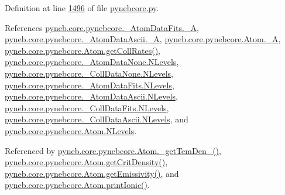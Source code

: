 Definition at line \hyperlink{pynebcore_8py_source_l01496}{1496} of file \hyperlink{pynebcore_8py_source}{pynebcore.\+py}.



References \hyperlink{pynebcore_8py_source_l00093}{pyneb.\+core.\+pynebcore.\+\_\+\+Atom\+Data\+Fits.\+\_\+\+A}, \hyperlink{pynebcore_8py_source_l00402}{pyneb.\+core.\+pynebcore.\+\_\+\+Atom\+Data\+Ascii.\+\_\+\+A}, \hyperlink{pynebcore_8py_source_l01256}{pyneb.\+core.\+pynebcore.\+Atom.\+\_\+\+A}, \hyperlink{pynebcore_8py_source_l01329}{pyneb.\+core.\+pynebcore.\+Atom.\+get\+Coll\+Rates()}, \hyperlink{pynebcore_8py_source_l00062}{pyneb.\+core.\+pynebcore.\+\_\+\+Atom\+Data\+None.\+N\+Levels}, \hyperlink{pynebcore_8py_source_l00075}{pyneb.\+core.\+pynebcore.\+\_\+\+Coll\+Data\+None.\+N\+Levels}, \hyperlink{pynebcore_8py_source_l00155}{pyneb.\+core.\+pynebcore.\+\_\+\+Atom\+Data\+Fits.\+N\+Levels}, \hyperlink{pynebcore_8py_source_l00404}{pyneb.\+core.\+pynebcore.\+\_\+\+Atom\+Data\+Ascii.\+N\+Levels}, \hyperlink{pynebcore_8py_source_l00637}{pyneb.\+core.\+pynebcore.\+\_\+\+Coll\+Data\+Fits.\+N\+Levels}, \hyperlink{pynebcore_8py_source_l00984}{pyneb.\+core.\+pynebcore.\+\_\+\+Coll\+Data\+Ascii.\+N\+Levels}, and \hyperlink{pynebcore_8py_source_l01260}{pyneb.\+core.\+pynebcore.\+Atom.\+N\+Levels}.



Referenced by \hyperlink{pynebcore_8py_source_l01803}{pyneb.\+core.\+pynebcore.\+Atom.\+\_\+get\+Tem\+Den\+\_()}, \hyperlink{pynebcore_8py_source_l01693}{pyneb.\+core.\+pynebcore.\+Atom.\+get\+Crit\+Density()}, \hyperlink{pynebcore_8py_source_l01716}{pyneb.\+core.\+pynebcore.\+Atom.\+get\+Emissivity()}, and \hyperlink{pynebcore_8py_source_l02167}{pyneb.\+core.\+pynebcore.\+Atom.\+print\+Ionic()}.


